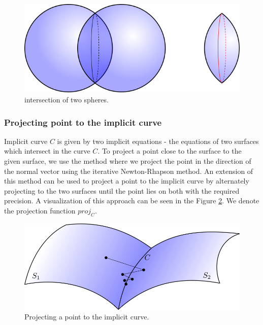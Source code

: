 \begin{figure}
    \centerline{\includegraphics[scale=0.5]{images/img35}}
    \caption[Intersection of a two spheres]
    {intersection of two spheres.}
    \label{img:35}
\end{figure}

\subsubsection{Projecting point to the implicit curve}

Implicit curve $C$ is given by two implicit equations - the equations of two surfaces
which intersect in the curve $C$.
To project a point close to the surface to the given surface, we use the method where
we project the point in the direction of the normal vector using the iterative 
Newton-Rhapson method. An extension of this method can be used to project a point
to the implicit curve by alternately projecting to the two surfaces until the
point lies on both with the required precision. A visualization of this approach can be
seen in the Figure \ref{img:36}. We denote the projection function $proj_C$.

\begin{figure}
    \centerline{\includegraphics[scale=0.5]{images/img36}}
    \caption[Projecting a point to the implicit curve]
    {Projecting a point to the implicit curve.}
    \label{img:36}
\end{figure}

